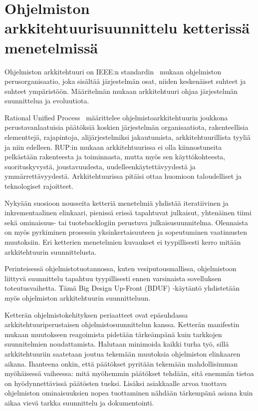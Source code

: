 \chapter*{Ohjelmiston arkkitehtuurisuunnittelu ketterissä menetelmissä}

Ohjelmiston arkkitehtuuri on IEEE:n standardin~\citep{jen2000working} mukaan ohjelmiston perusorganisaatio, joka sisältää järjestelmän osat, niiden keskenäiset suhteet ja suhteet ympäristöön. Määritelmän mukaan arkkitehtuuri ohjaa järjestelmän suunnittelua ja evoluutiota. 

Rational Unified Process~\citep{kruchten2004rational} määrittelee ohjelmistoarkkitehtuurin joukkona perustavanlaatuisia päätöksiä koskien järjestelmän organisaatiota, rakenteellisia elementtejä, rajapintoja, alijärjestelmiksi jakautumista, arkkitehtuurillista tyyliä ja niin edelleen. RUP:in mukaan arkkitehtuurissa ei olla kiinnostuneita pelkästään rakenteesta ja toiminnasta, mutta myös sen käyttökohteesta, suorituskyvystä, joustavuudesta, uudelleenkäytettävyydestä ja ymmärrettävyydestä. Arkkitehtuurissa pitäisi ottaa huomioon taloudelliset ja teknologiset rajoitteet.

Nykyään suosioon nousseita ketteriä menetelmiä yhdistää iteratiivinen ja inkrementaalinen elinkaari, pienissä erissä tapahtuvat julkaisut, yhtenäinen tiimi sekä ominaisuus- tai tuotebacklogiin perustuva julkaisusuunnitelma. Olennaista on myös pyrkiminen prosessin yksinkertaisuuteen ja sopeutuminen vaatimusten muutoksiin. Eri ketterien menetelmien kuvaukset ei tyypillisesti kerro mitään arkkitehtuurin suunnittelusta.~\citep{abrahamsson2010agility}

Perinteisessä ohjelmistotuotannossa, kuten vesiputousmallissa, ohjelmistoon liittyvä suunnittelu tapahtuu tyypillisesti ennen varsinaista sovelluksen toteutusvaihetta.
Tämä Big Design Up-Front (BDUF) -käytäntö yhdistetään myös ohjelmiston arkkitehtuurin suunnitteluun.~\citep{abrahamsson2010agility}

Ketterän ohjelmistokehityksen periaatteet ovat epäsuhdassa arkkitehtuuriperustaisen ohjelmistosuunnittelun kanssa. Ketterän manifestin~\citep{fowler2001agile} mukaan  muutokseen reagoimista pidetään tärkeämpänä kuin tarkkojen suunnitelmien noudattamista. Halutaan minimoida kaikki turha työ, sillä arkkitehtuuriin saatetaan joutua tekemään muutoksia ohjelmiston elinkaaren aikana. Ihanteena onkin, että päätökset pyritään tekemään mahdollisimman myöhäisessä vaiheessa: mitä myöhemmin päätökset tehdään, sitä enemmän tietoa on hyödynnettävissä päätösten tueksi. Lisäksi asiakkaalle arvoa tuottava ohjelmiston ominaisuuksien nopea tuottaminen nähdään tärkempänä asiana kuin aikaa vievä tarkka suunnittelu ja dokumentointi. 

